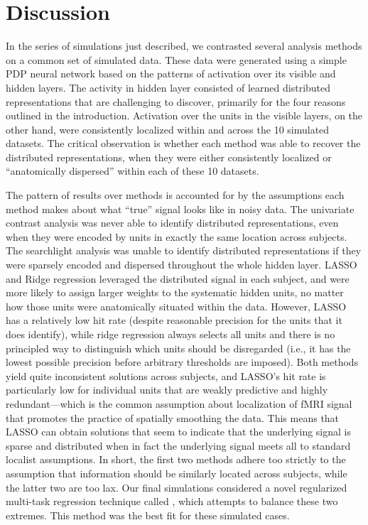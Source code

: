 \section{Discussion}
In the series of simulations just described, we contrasted several analysis methods on a common set of simulated data. These data were generated using a simple PDP neural network based on the patterns of activation over its visible and hidden layers. The activity in hidden layer consisted of learned distributed representations that are challenging to discover, primarily for the four reasons outlined in the introduction. Activation over the units in the visible layers, on the other hand, were consistently localized within and across the 10 simulated datasets. The critical observation is whether each method was able to recover the distributed representations, when they were either consistently localized or ``anatomically dispersed'' within each of these 10 datasets.  

The pattern of results over methods is accounted for by the assumptions each method makes about what ``true'' signal looks like in noisy data. The univariate contrast analysis was never able to identify distributed representations, even when they were encoded by units in exactly the same location across subjects. The searchlight analysis was unable to identify distributed representations if they were sparsely encoded and dispersed throughout the whole hidden layer. LASSO and Ridge regression leveraged the distributed signal in each subject, and were more likely to assign larger weights to the systematic hidden units, no matter how those units were anatomically situated within the data. However, LASSO has a relatively low hit rate (despite reasonable precision for the units that it does identify), while ridge regression always selects all units and there is no principled way to distinguish which units should be disregarded (i.e., it has the lowest possible precision before arbitrary thresholds are imposed). Both methods yield quite inconsistent solutions across subjects, and LASSO's hit rate is particularly low for individual units that are weakly predictive and highly redundant---which is the common assumption about localization of fMRI signal that promotes the practice of spatially smoothing the data. This means that LASSO can obtain solutions that seem to indicate that the underlying signal is sparse and distributed when in fact the underlying signal meets all to standard localist assumptions. In short, the first two methods adhere too strictly to the assumption that information should be similarly located across subjects, while the latter two are too lax.  Our final simulations	considered a novel regularized multi-task regression technique called \soslasso, which attempts to balance these two extremes. This method was the best fit for these simulated cases.

